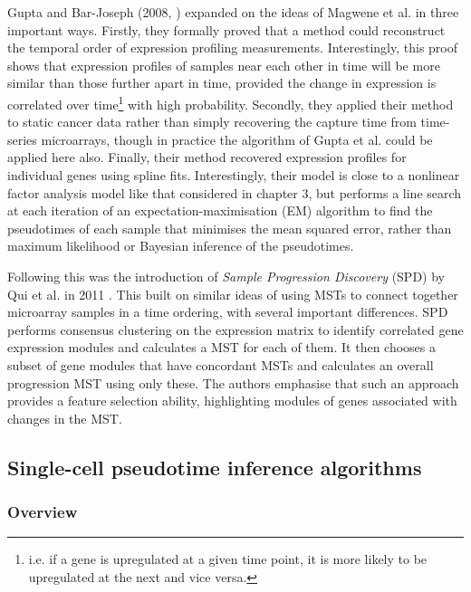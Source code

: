 Gupta and Bar-Joseph (2008, \cite{Gupta2008-fd}) expanded on the ideas of Magwene et al. in three important ways. Firstly, they formally proved that a method could reconstruct the temporal order of expression profiling measurements. Interestingly, this proof shows that expression profiles of samples near each other in time will be more similar than those further apart in time, provided the change in expression is correlated over time\footnote{i.e. if a gene is upregulated at a given time point, it is more likely to be upregulated at the next and vice versa.} with high probability.
Secondly, they applied their method to static cancer data rather than simply recovering the capture time from time-series microarrays, though in practice the algorithm of Gupta et al. could be applied here also. Finally, their method recovered expression profiles for individual genes using spline fits. Interestingly, their model is close to a nonlinear factor analysis model like that considered in chapter 3, but performs a line search at each iteration of an expectation-maximisation (EM) algorithm to find the pseudotimes of each sample that minimises the mean squared error, rather than maximum likelihood or Bayesian inference of the pseudotimes.

Following this was the introduction of \emph{Sample Progression Discovery} (SPD) by Qui et al. in 2011 \cite{Qiu2011-ol}. This built on similar ideas of using MSTs to connect together microarray samples in a time ordering, with several important differences. SPD performs consensus clustering on the expression matrix to identify correlated gene expression modules and calculates a MST for each of them. It then chooses a subset of gene modules that have concordant MSTs and calculates an overall progression MST using only these. The authors emphasise that such an approach provides a feature selection ability, highlighting modules of genes associated with changes in the MST.



\subsection{Single-cell pseudotime inference algorithms}

\subsubsection{Overview}

